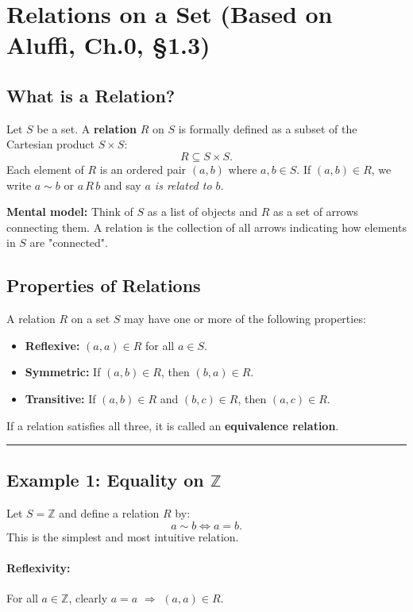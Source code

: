 \documentclass[10pt]{article}
\theoremstyle{plain}
\theoremstyle{definition}
\begin{document}
	\section*{Relations on a Set (Based on Aluffi, Ch.0, §1.3)}
	
	\subsection*{What is a Relation?}
	Let $S$ be a set. A \textbf{relation} $R$ on $S$ is formally defined as a subset of the Cartesian product $S \times S$:
	\[
	R \subseteq S \times S.
	\]
	Each element of $R$ is an ordered pair $(a, b)$ where $a, b \in S$. If $(a,b) \in R$, we write $a \sim b$ or $a \, R \, b$ and say \textit{$a$ is related to $b$}.
	
	\vspace{1em}
	\textbf{Mental model:} Think of $S$ as a list of objects and $R$ as a set of arrows connecting them. A relation is the collection of all arrows indicating how elements in $S$ are "connected".
	
	\subsection*{Properties of Relations}
	A relation $R$ on a set $S$ may have one or more of the following properties:
	\begin{itemize}
		\item \textbf{Reflexive:} $(a,a) \in R$ for all $a \in S$.
		\item \textbf{Symmetric:} If $(a,b) \in R$, then $(b,a) \in R$.
		\item \textbf{Transitive:} If $(a,b) \in R$ and $(b,c) \in R$, then $(a,c) \in R$.
	\end{itemize}
	
	If a relation satisfies all three, it is called an \textbf{equivalence relation}.
	
	\vspace{0.5em}
	\hrule
	\vspace{0.5em}
	
	\subsection*{Example 1: Equality on $\mathbb{Z}$}
	
	Let $S = \mathbb{Z}$ and define a relation $R$ by:
	\[
	a \sim b \iff a = b.
	\]
	This is the simplest and most intuitive relation.
	
	\paragraph{Reflexivity:} For all $a \in \mathbb{Z}$, clearly $a = a$ $\Rightarrow$ $(a,a) \in R$.
	
\end{document}
